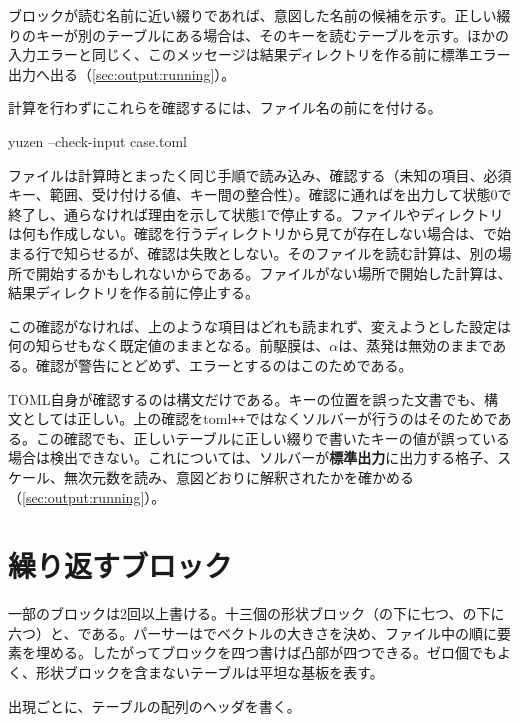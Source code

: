 ブロックが読む名前に近い綴りであれば、意図した名前の候補を示す。正しい綴りのキーが別のテーブルにある場合は、そのキーを読むテーブルを示す。ほかの入力エラーと同じく、このメッセージは結果ディレクトリを作る前に標準エラー出力へ出る（\cref{sec:output:running}）。

計算を行わずにこれらを確認するには、ファイル名の前にを付ける。

\begin{shell}
yuzen --check-input case.toml
\end{shell}

ファイルは計算時とまったく同じ手順で読み込み、確認する（未知の項目、必須キー、範囲、受け付ける値、キー間の整合性）。確認に通ればを出力して状態0で終了し、通らなければ理由を示して状態1で停止する。ファイルやディレクトリは何も作成しない。確認を行うディレクトリから見てが存在しない場合は、で始まる行で知らせるが、確認は失敗としない。そのファイルを読む計算は、別の場所で開始するかもしれないからである。ファイルがない場所で開始した計算は、結果ディレクトリを作る前に停止する。

この確認がなければ、上のような項目はどれも読まれず、変えようとした設定は何の知らせもなく既定値のままとなる。前駆膜は、$\alpha$は、蒸発は無効のままである。確認が警告にとどめず、エラーとするのはこのためである。

TOML自身が確認するのは構文だけである。キーの位置を誤った文書でも、構文としては正しい。上の確認をtoml\texttt{++}ではなくソルバーが行うのはそのためである。この確認でも、正しいテーブルに正しい綴りで書いたキーの値が誤っている場合は検出できない。これについては、ソルバーが\textbf{標準出力}に出力する格子、スケール、無次元数を読み、意図どおりに解釈されたかを確かめる（\cref{sec:output:running}）。

\section{繰り返すブロック}
\label{sec:inputformat:repeat}

一部のブロックは2回以上書ける。十三個の形状ブロック（の下に七つ、の下に六つ）と、である。パーサーはでベクトルの大きさを決め、ファイル中の順に要素を埋める。したがってブロックを四つ書けば凸部が四つできる。ゼロ個でもよく、形状ブロックを含まないテーブルは平坦な基板を表す。

出現ごとに、テーブルの配列のヘッダを書く。

